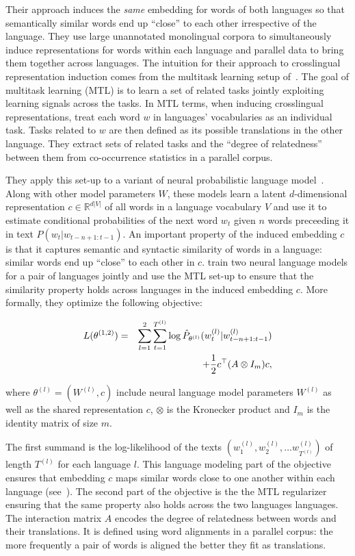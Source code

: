 \documentclass[11pt,letterpaper]{article}
\begin{document}
Their approach induces the \emph{same} embedding for words of both languages so that semantically similar words end up ``close'' to each other irrespective of the language.  They use large unannotated monolingual corpora to simultaneously induce representations for words within each language and parallel data to bring them together across languages.  The intuition for their approach to crosslingual representation induction comes from the multitask learning setup of~\cite{Cavallanti:2010}.  The goal of multitask learning (MTL) is to learn a set of related tasks jointly exploiting learning signals across the tasks.  In MTL terms, when inducing crosslingual representations, \cite{Klementiev-et-al:COLING2012} treat each word $w$ in languages'  vocabularies as an individual task.  Tasks related to $w$ are then defined as its possible translations in the other language.  They extract sets of related tasks and the ``degree of relatedness'' between them from co-occurrence statistics in a parallel corpus.

They apply this set-up to a variant of neural probabilistic language model~\cite{Bengio:2003}.  Along with other model parameters $W$, these models learn a latent $d$-dimensional representation $c \in \mathbb{R}^{d|V|}$ of all words in a language vocabulary $V$ and use it to estimate conditional probabilities of the next word $w_t$ given $n$ words preceeding it in text $\hat{P}(w_t | w_{t-n+1:t-1})$.  An important property of the induced embedding $c$ is that it captures semantic and syntactic similarity of words in a language: similar words end up ``close'' to each other in $c$.  \cite{Klementiev-et-al:COLING2012} train two neural language models for a pair of languages jointly and use the MTL set-up to ensure that the similarity property holds across languages in the induced embedding $c$.  More formally, they optimize the following objective:

\begin{eqnarray}
 L(\theta^{(1,2)}) & = & \sum_{l=1}^{2} {\sum_{t = 1}^{T^{(l)}} \log \hat{P}_{\theta^{(l)}}(w^{(l)}_t | w^{(l)}_{t-n+1:t-1})} \nonumber \\
 &&+ {1  \over 2} c^{\top} (A \otimes I_m) c, \nonumber
 \end{eqnarray}

where $\theta^{(l)} = (W^{(l)}, c)$ include neural language model parameters $W^{(l)}$ as well as the shared  representation $c$, $\otimes$ is the Kronecker product and $I_m$ is the identity 
matrix of size $m$.  

The first summand is the log-likelihood of the texts $(w_1^{(l)}, w_2^{(l)}, \dots w_{T^{(l)}}^{(l)})$ of length $T^{(l)}$ for each language $l$.  This language modeling part of the objective ensures that embedding $c$ maps similar words close to one another within each language (see~\cite{Bengio:2003}).  The second part of the objective is the the MTL regularizer ensuring that the same property also holds across the two languages languages.  
The interaction matrix $A$ encodes the degree of relatedness between words and their translations.   
It is defined using word alignments in a parallel corpus: the more frequently a pair of words is aligned the better they fit as translations.
\end{document}
